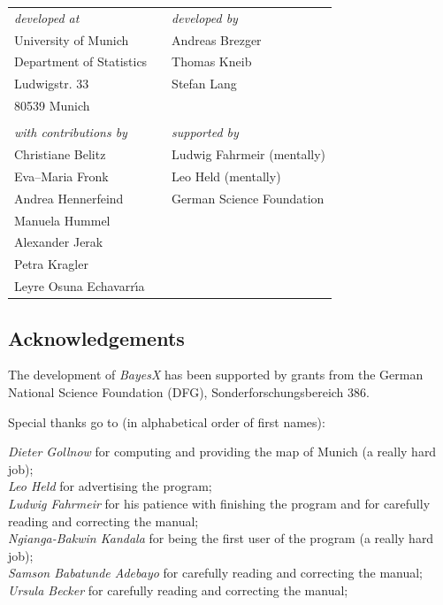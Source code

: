 \documentclass[11pt,a4paper,twoside]{bayesxarticle}
\begin{document}
\begin{table}[ht]
\begin{center}
\begin{tabular}{lll}
{\em developed at} & \hspace{1.5cm} & {\em developed by} \\
University of Munich & \hspace{1.5cm} & Andreas Brezger \\
Department of Statistics & \hspace{1.5cm} & Thomas Kneib \\
Ludwigstr. 33 & \hspace{1.5cm} & Stefan Lang \\
80539 Munich & \hspace{1.5cm} & \\
  & & \\
{\em with contributions by}  &  \hspace{1.5cm} &  {\em supported by} \\
Christiane Belitz&  \hspace{1.5cm} & Ludwig Fahrmeir (mentally) \\
Eva--Maria Fronk  & \hspace{1.5cm} & Leo Held (mentally) \\
Andrea Hennerfeind & \hspace{1.5cm} & German Science Foundation  \\
Manuela Hummel & \\
Alexander Jerak & \\
Petra Kragler & \\
Leyre Osuna Echavarr\'{\i}a& \\
\end{tabular}
\end{center}
\end{table}


\newpage

\subsection*{Acknowledgements}

The development of {\em BayesX} has been supported by grants from
the German National Science Foundation (DFG),
Sonderforschungsbereich 386.

Special thanks go to (in alphabetical order of first names):

{\em Dieter Gollnow} for computing and providing the map of Munich (a really hard job); \\
{\em Leo Held} for advertising the program; \\
{\em Ludwig Fahrmeir} for his patience with finishing the program
and for carefully
reading and correcting the  manual; \\
{\em Ngianga-Bakwin Kandala} for being the first user of the program (a really hard job); \\
{\em Samson Babatunde Adebayo} for carefully reading and correcting the manual; \\
{\em Ursula Becker} for carefully reading and correcting the manual;
\end{document}
